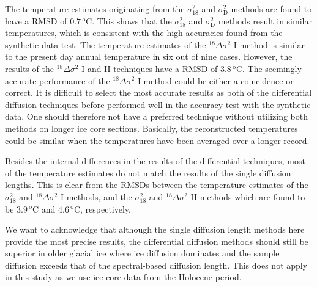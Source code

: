 \documentclass[11pt, draftcls, onecolumn]{IEEEtran} %
\numberwithin{equation}{section}
\numberwithin{table}{section}
\numberwithin{figure}{section}
\begin{document}
The temperature estimates originating from the $\sigma^2_{18}$ and $\sigma^2_{\mathrm{D}}$ methods are found to have a RMSD of $0.7\,^\mathrm{o}\mathrm{C}$. This shows that the $\sigma^2_{18}$ and $\sigma^2_{\mathrm{D}}$ methods result in similar temperatures, which is consistent with the high accuracies found from the synthetic data test.
The temperature estimates of the ${}^{18}\Delta\sigma^2$ I method is similar to the present day annual temperature in six out of nine cases. 
However, the results of the ${}^{18}\Delta\sigma^2$ I and II techniques have a RMSD of $3.8\,^\mathrm{o}\mathrm{C}$.
The seemingly accurate performance of the ${}^{18}\Delta\sigma^2$ I method could be either a coincidence or correct. 
It is difficult to select the most accurate results as both of the differential diffusion techniques
before performed well in the accuracy test with the synthetic data.
One should therefore not have a preferred technique without utilizing both methods on longer ice core sections.
Basically, the reconstructed temperatures could be similar when the temperatures have been averaged over a longer record.


Besides the internal differences in the results of the differential techniques, most of the temperature estimates do not 
match the results of the single diffusion lengths.
This is clear from the RMSDs between the temperature estimates of the $\sigma^2_{18}$ and ${}^{18}\Delta\sigma^2$ I methods, 
and the $\sigma^2_{18}$ and ${}^{18}\Delta\sigma^2$ II methods which are found to be  
$3.9\,^\mathrm{o}\mathrm{C}$ and $4.6\,^\mathrm{o}\mathrm{C}$, respectively.

We want to acknowledge that although the single diffusion length methods here provide
the most precise results, the differential diffusion methods 
should still be superior in older glacial ice where ice diffusion dominates 
and the sample diffusion exceeds that of the spectral-based diffusion length.
This does not apply in this study as we use ice core data from the Holocene period.
\end{document}
